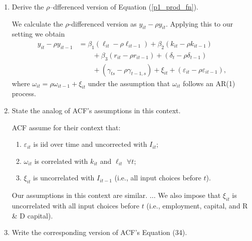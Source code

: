\documentclass{article}
\begin{document}
\begin{enumerate}
\item Derive the $\rho$–dfferenced version of Equation (\ref{p1_prod_fn}).

\begin{answer}

We calculate the $\rho$-differenced version as $y_{it} - \rho y_{it}$. Applying this to our setting we obtain 
\begin{align*}
    y_{it} - \rho  y_{it-1}
    & = \beta_1 (\ell_{it} - \rho \ell_{it-1}) + \beta_2 (k_{it} - \rho k_{it-1}) \\ 
    &\quad \quad + \beta_3 (r_{it}  - \rho r_{it-1}) 
    + (\delta_t - \rho \delta_{t-1}) \\ 
    &\quad\quad + (\gamma_{ts} - \rho \gamma_{t-1, s}) + \xi_{it} + (\varepsilon_{it}-\rho\varepsilon_{it-1}),
\end{align*}
where $\omega_{it} = \rho \omega_{it-1} + \xi_{it}$ under the assumption that $\omega_{it}$ follows an AR(1) process. 


\end{answer}



\item State the analog of ACF’s assumptions in this context. 

\begin{answer}

ACF assume for their context that: 
\begin{enumerate}
    \item $\varepsilon_{it}$ is iid over time and uncorrected with $I_{it}$; 
    \item $\omega_{it}$ is correlated with $k_{it}$ and $\ell_{it}$ $\forall t$; 
    \item $\xi_{it}$ is uncorrelated with $I_{it-1}$ (i.e., all input choices before $t$). 
\end{enumerate}

Our assumptions in this context are similar. ...  We also impose that $\xi_{it}$ is uncorrelated with all input choices before $t$ (i.e., employment, capital, and R \& D capital).

\end{answer}


\item Write the corresponding version of ACF’s Equation (34).



\end{enumerate}
\end{document}
